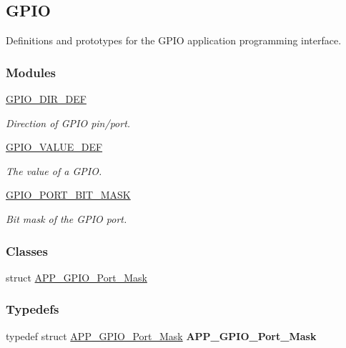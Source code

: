 \hypertarget{group___g_p_i_o}{}\subsection{G\+P\+IO}
\label{group___g_p_i_o}


Definitions and prototypes for the G\+P\+IO application programming interface.  


\subsubsection*{Modules}
\begin{DoxyCompactItemize}
\item 
\hyperlink{group___g_p_i_o___d_i_r___d_e_f}{G\+P\+I\+O\+\_\+\+D\+I\+R\+\_\+\+D\+EF}
\begin{DoxyCompactList}\small\item\em Direction of G\+P\+IO pin/port. \end{DoxyCompactList}\item 
\hyperlink{group___g_p_i_o___v_a_l_u_e___d_e_f}{G\+P\+I\+O\+\_\+\+V\+A\+L\+U\+E\+\_\+\+D\+EF}
\begin{DoxyCompactList}\small\item\em The value of a G\+P\+IO. \end{DoxyCompactList}\item 
\hyperlink{group___g_p_i_o___p_o_r_t___b_i_t___m_a_s_k}{G\+P\+I\+O\+\_\+\+P\+O\+R\+T\+\_\+\+B\+I\+T\+\_\+\+M\+A\+SK}
\begin{DoxyCompactList}\small\item\em Bit mask of the G\+P\+IO port. \end{DoxyCompactList}\end{DoxyCompactItemize}
\subsubsection*{Classes}
\begin{DoxyCompactItemize}
\item 
struct \hyperlink{struct_a_p_p___g_p_i_o___port___mask}{A\+P\+P\+\_\+\+G\+P\+I\+O\+\_\+\+Port\+\_\+\+Mask}
\end{DoxyCompactItemize}
\subsubsection*{Typedefs}
\begin{DoxyCompactItemize}
\item 
typedef struct \hyperlink{struct_a_p_p___g_p_i_o___port___mask}{A\+P\+P\+\_\+\+G\+P\+I\+O\+\_\+\+Port\+\_\+\+Mask} {\bfseries A\+P\+P\+\_\+\+G\+P\+I\+O\+\_\+\+Port\+\_\+\+Mask}\hypertarget{group___g_p_i_o_ga6695365de699284fb44652d8454de750}{}\label{group___g_p_i_o_ga6695365de699284fb44652d8454de750}

\end{DoxyCompactItemize}
